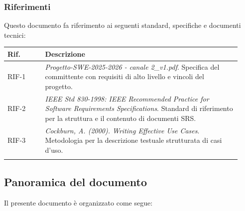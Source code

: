 \subsubsection{Riferimenti}
\label{subsec:riferimenti}

Questo documento fa riferimento ai seguenti standard, specifiche e documenti tecnici:

\begin{longtable}{p{0.15\linewidth} p{0.78\linewidth}}
\toprule
\textbf{Rif.} & \textbf{Descrizione} \\
\midrule
\endhead
\bottomrule
\endfoot

RIF-1 & \textit{Progetto-SWE-2025-2026 - canale 2\_v1.pdf}. Specifica del committente con requisiti di alto livello e vincoli del progetto. \\
\addlinespace

RIF-2 & \textit{IEEE Std 830-1998: IEEE Recommended Practice for Software Requirements Specifications}. Standard di riferimento per la struttura e il contenuto di documenti SRS. \\
\addlinespace

RIF-3 & \textit{Cockburn, A. (2000). Writing Effective Use Cases}. Metodologia per la descrizione testuale strutturata di casi d'uso. \\
\addlinespace

\end{longtable}

\newpage

\subsection{Panoramica del documento}
\label{subsec:panoramica}

Il presente documento è organizzato come segue:

